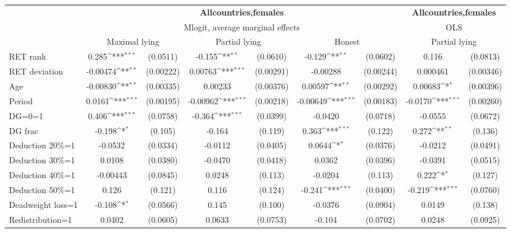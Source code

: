 \def\sym#1{\ifmmode^{#1}\else\(^{#1}\)\fi}
\begin{tabular}{l|cccccc|cc}
\hline\hline
&\multicolumn{6}{c|}{\bf All\space{}countries,\space{}females}&\multicolumn{2}{c}{\bf All\space{}countries,\space{}females}\\ &\multicolumn{6}{c|}{Mlogit, average marginal effects }&\multicolumn{2}{c}{OLS}\\
                &\multicolumn{2}{c}{Maximal lying}&\multicolumn{2}{c}{Partial lying}&\multicolumn{2}{c}{Honest}  &\multicolumn{2}{c}{Partial lying}\\
\hline
RET rank        &    0.285\sym{***}& (0.0511)&   -0.155\sym{**} & (0.0610)&   -0.129\sym{**} & (0.0602)&    0.116         & (0.0813)\\
RET deviation   & -0.00474\sym{**} &(0.00222)&  0.00763\sym{***}&(0.00291)& -0.00288         &(0.00244)& 0.000461         &(0.00346)\\
Age             & -0.00830\sym{**} &(0.00335)&  0.00233         &(0.00376)&  0.00597\sym{**} &(0.00292)&  0.00683\sym{*}  &(0.00396)\\
Period          &   0.0161\sym{***}&(0.00195)& -0.00962\sym{***}&(0.00218)& -0.00649\sym{***}&(0.00183)&  -0.0170\sym{***}&(0.00260)\\
DG=0=1          &    0.406\sym{***}& (0.0758)&   -0.364\sym{***}& (0.0399)&  -0.0420         & (0.0718)&  -0.0555         & (0.0672)\\
DG frac         &   -0.198\sym{*}  &  (0.105)&   -0.164         &  (0.119)&    0.363\sym{***}&  (0.122)&    0.272\sym{**} &  (0.136)\\
Deduction 20\%=1&  -0.0532         & (0.0334)&  -0.0112         & (0.0405)&   0.0644\sym{*}  & (0.0376)&  -0.0212         & (0.0491)\\
Deduction 30\%=1&   0.0108         & (0.0380)&  -0.0470         & (0.0418)&   0.0362         & (0.0396)&  -0.0391         & (0.0515)\\
Deduction 40\%=1& -0.00443         & (0.0845)&   0.0248         &  (0.113)&  -0.0204         &  (0.113)&    0.222\sym{*}  &  (0.127)\\
Deduction 50\%=1&    0.126         &  (0.121)&    0.116         &  (0.124)&   -0.241\sym{***}& (0.0400)&   -0.219\sym{***}& (0.0760)\\
Deadweight loss=1&   -0.108\sym{*}  & (0.0566)&    0.145         &  (0.100)&  -0.0376         & (0.0904)&   0.0149         &  (0.138)\\
Redistribution=1&   0.0402         & (0.0605)&   0.0633         & (0.0753)&   -0.104         & (0.0702)&   0.0248         & (0.0925)\\

\end{tabular}
